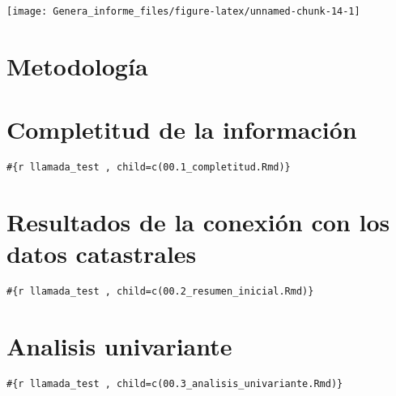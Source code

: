 \documentclass[
]{article}
\begin{document}
\begin{center}\texttt{[image: Genera\_informe\_files/figure-latex/unnamed-chunk-14-1]} \end{center}

\hypertarget{metodologuxeda}{%
\section{Metodología}\label{metodologuxeda}}

\hypertarget{completitud-de-la-informaciuxf3n}{%
\section{Completitud de la
información}\label{completitud-de-la-informaciuxf3n}}

\texttt{\#\{r\ llamada\_test\ ,\ child=c(\textquotesingle{}00.1\_completitud.Rmd\textquotesingle{})\}}

\hypertarget{resultados-de-la-conexiuxf3n-con-los-datos-catastrales}{%
\section{Resultados de la conexión con los datos
catastrales}\label{resultados-de-la-conexiuxf3n-con-los-datos-catastrales}}

\texttt{\#\{r\ llamada\_test\ ,\ child=c(\textquotesingle{}00.2\_resumen\_inicial.Rmd\textquotesingle{})\}}

\hypertarget{analisis-univariante}{%
\section{Analisis univariante}\label{analisis-univariante}}

\texttt{\#\{r\ llamada\_test\ ,\ child=c(\textquotesingle{}00.3\_analisis\_univariante.Rmd\textquotesingle{})\}}
\end{document}
